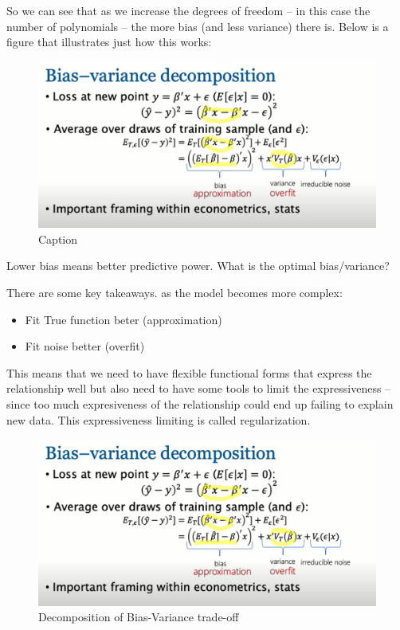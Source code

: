 \documentclass{article}
\begin{document}
So we can see that as we increase the degrees of freedom -- in this case the number of polynomials -- the more bias (and less variance) there is. Below is a figure that illustrates just how this works:

\begin{figure}[H]
    \centering
    \includegraphics[scale =0.5]{bias_variance.png}
    \caption{Caption}
    \label{fig:bias_plot}
\end{figure}

Lower bias means better predictive power. What is the optimal bias/variance?

There are some key takeaways. as the model becomes more complex:

\begin{itemize}
    \item Fit True function beter (approximation)
    \item Fit noise better (overfit)
\end{itemize}

This means that we need to have flexible functional forms that express the relationship well but also need to have some tools to limit the expressiveness -- since too much expresiveness of the relationship could end up failing to explain new data. This expressiveness limiting is called regularization. 

\begin{figure}[H]
    \centering
    \includegraphics[scale =0.5]{bias_variance.png}
    \caption{Decomposition of Bias-Variance trade-off}
    \label{fig:overfit}
\end{figure}
\end{document}
